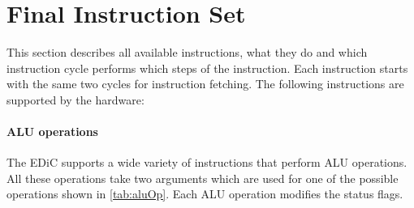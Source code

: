 \section{Final Instruction Set}\label{sec:instructionSet}
This section describes all available instructions, what they do and which instruction cycle performs which steps of the instruction.
Each instruction starts with the same two cycles for instruction fetching.
The following instructions are supported by the hardware:
\paragraph{\gls{ALU} operations}
The \gls{EDiC} supports a wide variety of instructions that perform \gls{ALU} operations.
All these operations take two arguments which are used for one of the possible operations shown in \cref{tab:aluOp}.
Each \gls{ALU} operation modifies the status flags.
